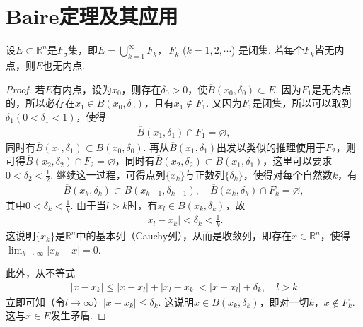 \documentclass[../../main.tex]{subfiles}%
\begin{document}
\section{Baire定理及其应用}


\begin{theorem}[Baire定理]\label{theorem:Baire定理}
设$E\subset\mathbb{R}^n$是$F_{\sigma}$集，即$E = \bigcup_{k = 1}^{\infty}F_k$，$\,F_k$ ($k = 1,2,\cdots$) 是闭集. 若每个$F_k$皆无内点，则$E$也无内点.
\end{theorem}
\begin{proof}

若$E$有内点，设为$x_0$，则存在$\delta_0>0$，使$\overline{B}(x_0,\delta_0)\subset E$. 因为$F_1$是无内点的，所以必存在$x_1\in B(x_0,\delta_0)$，且有$x_1\notin F_1$. 又因为$F_1$是闭集，所以可以取到$\delta_1(0<\delta_1<1)$，使得
\begin{align*}
\overline{B}(x_1,\delta_1)\cap F_1=\varnothing,
\end{align*}
同时有$\overline{B}(x_1,\delta_1)\subset B(x_0,\delta_0)$. 再从$\overline{B}(x_1,\delta_1)$出发以类似的推理使用于$F_2$，则可得$\overline{B}(x_2,\delta_2)\cap F_2=\varnothing$，同时有$\overline{B}(x_2,\delta_2)\subset B(x_1,\delta_1)$，这里可以要求$0<\delta_2<\frac{1}{2}$. 继续这一过程，可得点列$\{x_k\}$与正数列$\{\delta_k\}$，使得对每个自然数$k$，有
\begin{align*}
\overline{B}(x_k,\delta_k)\subset B(x_{k - 1},\delta_{k - 1}), \quad \overline{B}(x_k,\delta_k)\cap F_k=\varnothing,
\end{align*}
其中$0<\delta_k<\frac{1}{k}$. 由于当$l>k$时，有$x_l\in B(x_k,\delta_k)$，故
\begin{align*}
|x_l - x_k|<\delta_k<\frac{1}{k}.
\end{align*}
这说明$\{x_k\}$是$\mathbb{R}^n$中的基本列（Cauchy列），从而是收敛列，即存在$x\in\mathbb{R}^n$，使得$\lim_{k\to\infty}|x_k - x| = 0$.

此外，从不等式
\begin{align*}
|x - x_k|\leqslant|x - x_l|+|x_l - x_k|<|x - x_l|+\delta_k, \quad l>k
\end{align*}
立即可知（令$l\to\infty$）$|x - x_k|\leqslant\delta_k$. 这说明$x\in\overline{B}(x_k,\delta_k)$，即对一切$k$，$x\notin F_k$. 这与$x\in E$发生矛盾. 

\end{proof}
\end{document}
